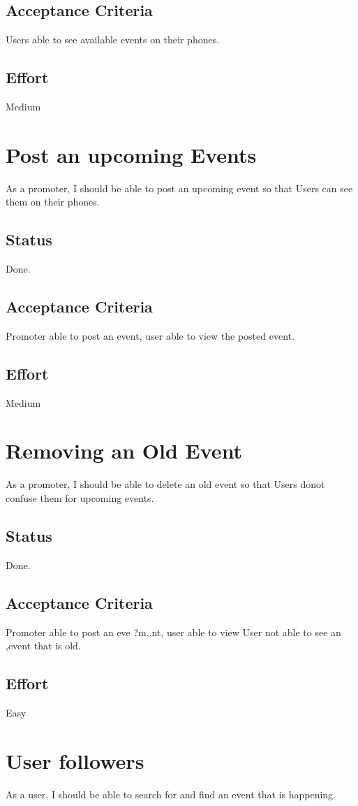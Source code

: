 \documentclass[10pt,a4paper]{article}
\begin{document}
\subsection{Acceptance Criteria}
Users able to see available events on their phones.
\subsection{Effort}
Medium

\section{Post an upcoming Events}
As a promoter, I should be able to post an upcoming event so that Users can see them on their phones.
\subsection{Status}
Done.
\subsection{Acceptance Criteria}
Promoter able to post an event, user able to view the posted event.
\subsection{Effort}
Medium

\section{Removing an Old Event}
As a promoter, I should be able to delete an old event so that Users donot confuse them for upcoming events.
\subsection{Status}
Done.
\subsection{Acceptance Criteria}
Promoter able to post an eve ?m,.nt, user able to view User not able to see an ,event that is old.
\subsection{Effort}
Easy

\section{User followers}
As a user, I should be able to search for and find an event that is happening.
\end{document}
